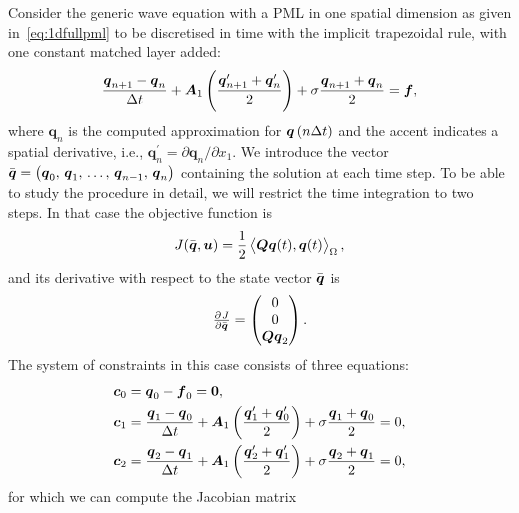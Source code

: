 \documentclass[a4paper]{article}
\renewcommand{\vec}{\boldsymbol}
\begin{document}
Consider the generic wave equation with a PML in one spatial dimension
as given in~\eqref{eq:1dfullpml} to be discretised in time with the
implicit trapezoidal rule, with one constant matched layer added:
\begin{equation}
  \frac{\vec{q}_{n+1} - \vec{q}_{n}}{\Delta t}
  + \vec{A}_{1}\del{\frac{\vec{q}_{n + 1}^\prime + \vec{q}_{n}^\prime}{2}}
  + \sigma \frac{\vec{q}_{n + 1}+\vec{q}_{n}}{2} = \vec{f},
\end{equation}
where $\vec{q}_{n}$ is the computed approximation for
$\vec{q}\del{n\Delta t}$ and the accent indicates a spatial
derivative, i.e., $\vec{q}_{n}^\prime = \partial\vec{q}_n/\partial
x_1$.  We introduce the vector $\Bar{\vec{q}} = \del{\vec{q}_{0}, \,
  \vec{q}_{1}, \, \ldots, \, \vec{q}_{n-1}, \, \vec{q}_{n}}$
containing the solution at each time step.  To be able to study the
procedure in detail, we will restrict the time integration to two
steps.  In that case the objective function is
\begin{equation}
  J(\Bar{\vec{q}}, \vec{u})
  = \frac{1}{2} \left<\vec{Q} \vec{q}(t), \vec{q}(t) \right>_\Omega,
\end{equation}
and its derivative with respect to the state vector $\Bar{\vec{q}}$ is
\begin{equation}
\pd{J}{\Bar{\vec{q}}}
=
\begin{pmatrix}
0 \\ 0 \\ \vec{Q}\vec{q}_{2}
\end{pmatrix}.
\end{equation}
The system of constraints in this case consists of three equations:
\begin{equation}
\begin{aligned}
\vec{c}_{0} &= \vec{q}_{0} - \vec{f}_{0} = \vec{0},
\\
\vec{c}_{1} &= \frac{\vec{q}_{1} - \vec{q}_{0}}{\Delta t}
+ \vec{A}_{1}\del{\frac{\vec{q}_{1}^\prime + \vec{q}_{0}^\prime}{2}}
+ \sigma \frac{\vec{q}_{1}+\vec{q}_{0}}{2} = 0,
\\
\vec{c}_{2} &= \frac{\vec{q}_{2} - \vec{q}_{1}}{\Delta t}
+ \vec{A}_1 \del{\frac{\vec{q}_{2}^\prime + \vec{q}_{1}^\prime}{2}}
+ \sigma \frac{\vec{q}_{2} + \vec{q}_{1}}{2} = 0,
\end{aligned}
\label{eq:forwardsolve}
\end{equation}
for which we can compute the Jacobian matrix
\end{document}
